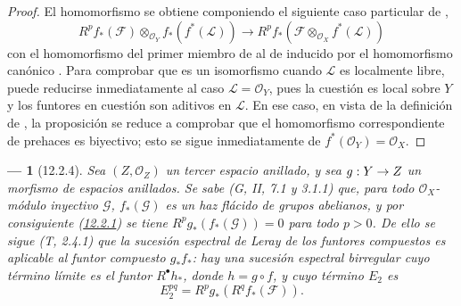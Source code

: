 \documentclass[10pt,oneside,openany]{book}
\theoremstyle{egaenv}\newtheorem*{env}{---}
\theoremstyle{egastatement}
\theoremstyle{egadescription}
\renewcommand{\to}{\mathchoice{\longrightarrow}{\rightarrow}{\rightarrow}{\rightarrow}}
\begin{document}
\begin{proof}
El homomorfismo  se obtiene componiendo el
siguiente caso particular de ,
\[
\label{0.12.2.3.2-fr}
\tag{12.2.3.2}
R^p f_*(\mathcal F)\otimes_{\mathcal O_Y}f_*(f^*(\mathcal L))
\longrightarrow
R^p f_*(\mathcal F\otimes_{\mathcal O_X}f^*(\mathcal L))
\]
con el homomorfismo del primer miembro de
 al de  inducido por el
homomorfismo canónico .
Para comprobar que  es un isomorfismo cuando $\mathcal L$ es
localmente libre, puede reducirse inmediatamente al caso
$\mathcal L=\mathcal O_Y$, pues la cuestión es local sobre $Y$ y los
funtores en cuestión son aditivos en $\mathcal L$.
En ese caso, en vista de la definición de , la
proposición se reduce a comprobar que el homomorfismo correspondiente
de prehaces es biyectivo; esto se sigue inmediatamente de
$f^*(\mathcal O_Y)=\mathcal O_X$.
\end{proof}

\begin{env}[12.2.4]
\label{0.12.2.4}
\label{0.12.2.4-fr}
Sea $(Z,\mathcal O_Z)$ un tercer espacio anillado, y sea
$g:Y\to Z$ un morfismo de espacios anillados.
Se sabe (G, II, 7.1 y 3.1.1) que, para todo
$\mathcal O_X$-módulo inyectivo $\mathcal G$, $f_*(\mathcal G)$ es un haz flácido de grupos abelianos, y por consiguiente (\hyperref[0.12.2.1-fr]{12.2.1}) se tiene $R^p g_*(f_*(\mathcal G))=0$ para todo $p>0$. De ello se sigue (T, 2.4.1) que la \emph{sucesión espectral de Leray} de los funtores compuestos es aplicable al funtor compuesto $g_*f_*$: hay una sucesión espectral \emph{birregular} cuyo término límite es el funtor $R^\bullet h_*$, donde $h=g\circ f$, y cuyo término $E_2$ es
\[
\label{0.12.2.4.1-fr}
\tag{12.2.4.1}
E_2^{pq}=R^p g_*(R^q f_*(\mathcal F)).
\]
\end{env}
\end{document}
